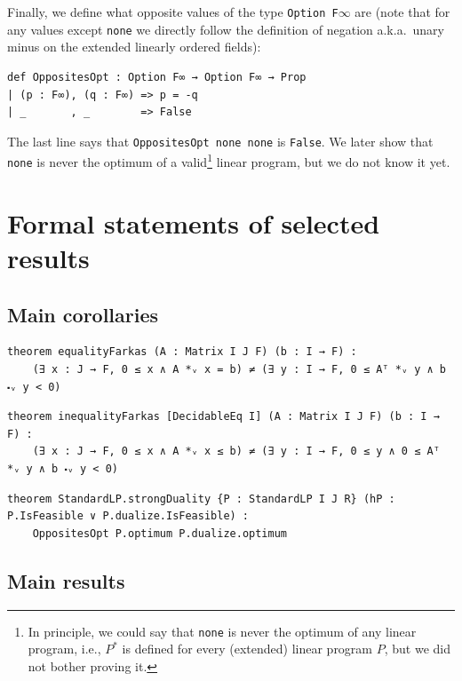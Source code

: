 \documentclass[]{article}
\renewcommand{\.}{\hskip .75pt}
\begin{document}
Finally, we define what opposite values of the type \texttt{Option F$\infty$} are
(note that for any values except \texttt{none} we directly follow the definition
of negation a.k.a.\ unary minus on the extended linearly ordered fields):
\begin{lstlisting}
def OppositesOpt : Option F∞ → Option F∞ → Prop
| (p : F∞), (q : F∞) => p = -q
| _       , _        => False
\end{lstlisting}
The last line says that \texttt{OppositesOpt none none} is \texttt{False}.
We later show that \texttt{none} is never the optimum of a valid\footnote{
In principle, we could say that \texttt{none} is never the optimum of any
linear program, i.e., $P^\ast$ is defined for every (extended) linear program $P$,
but we did not bother proving it.} linear program, but we do not know it yet.


\section{Formal statements of selected results}
\label{statements}

\subsection{Main corollaries}

\begin{lstlisting}
theorem equalityFarkas (A : Matrix I J F) (b : I → F) :
    (∃ x : J → F, 0 ≤ x ∧ A *ᵥ x = b) ≠ (∃ y : I → F, 0 ≤ Aᵀ *ᵥ y ∧ b ⬝ᵥ y < 0)
\end{lstlisting}
\begin{lstlisting}
theorem inequalityFarkas [DecidableEq I] (A : Matrix I J F) (b : I → F) :
    (∃ x : J → F, 0 ≤ x ∧ A *ᵥ x ≤ b) ≠ (∃ y : I → F, 0 ≤ y ∧ 0 ≤ Aᵀ *ᵥ y ∧ b ⬝ᵥ y < 0)
\end{lstlisting}
\begin{lstlisting}
theorem StandardLP.strongDuality {P : StandardLP I J R} (hP : P.IsFeasible ∨ P.dualize.IsFeasible) :
    OppositesOpt P.optimum P.dualize.optimum
\end{lstlisting}

\subsection{Main results}
\end{document}
